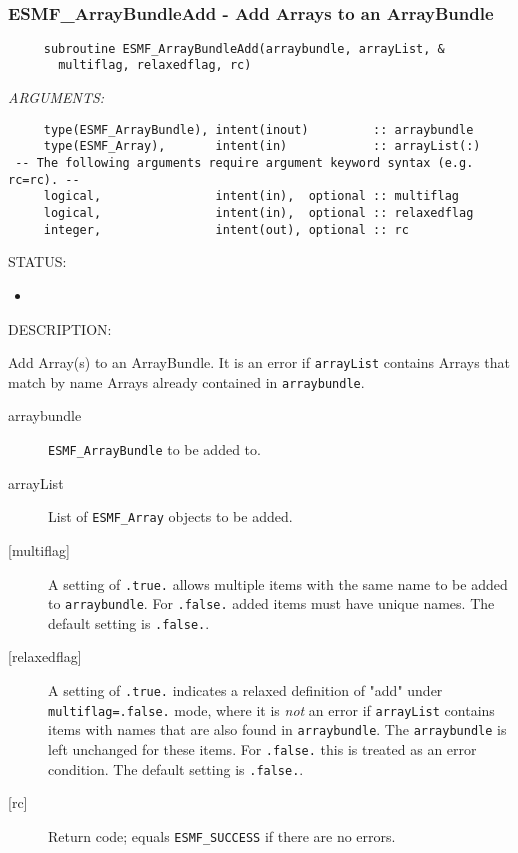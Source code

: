  
\mbox{}\hrulefill\ 
 
\subsubsection [ESMF\_ArrayBundleAdd] {ESMF\_ArrayBundleAdd - Add Arrays to an ArrayBundle}


  
\begin{verbatim}     subroutine ESMF_ArrayBundleAdd(arraybundle, arrayList, &
       multiflag, relaxedflag, rc)\end{verbatim}{\em ARGUMENTS:}
\begin{verbatim}     type(ESMF_ArrayBundle), intent(inout)         :: arraybundle
     type(ESMF_Array),       intent(in)            :: arrayList(:)
 -- The following arguments require argument keyword syntax (e.g. rc=rc). --
     logical,                intent(in),  optional :: multiflag
     logical,                intent(in),  optional :: relaxedflag
     integer,                intent(out), optional :: rc\end{verbatim}
{\sf STATUS:}
   \begin{itemize}
   \item{}
   \end{itemize}
  
{\sf DESCRIPTION:\\ }


     Add Array(s) to an ArrayBundle. It is an error if {\tt arrayList} contains
     Arrays that match by name Arrays already contained in {\tt arraybundle}.
  
     \begin{description}
     \item [arraybundle]
       {\tt ESMF\_ArrayBundle} to be added to.
     \item [arrayList]
       List of {\tt ESMF\_Array} objects to be added.
     \item [{[multiflag]}]
       A setting of {\tt .true.} allows multiple items with the same name
       to be added to {\tt arraybundle}. For {\tt .false.} added items must
       have unique names. The default setting is {\tt .false.}.
     \item [{[relaxedflag]}]
       A setting of {\tt .true.} indicates a relaxed definition of "add"
       under {\tt multiflag=.false.} mode, where it is {\em not} an error if 
       {\tt arrayList} contains items with names that are also found in 
       {\tt arraybundle}. The {\tt arraybundle} is left unchanged for these items.
       For {\tt .false.} this is treated as an error condition. 
       The default setting is {\tt .false.}.
     \item [{[rc]}]
       Return code; equals {\tt ESMF\_SUCCESS} if there are no errors.
     \end{description}
   
